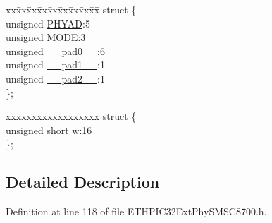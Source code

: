 \begin{DoxyCompactItemize}
\begin{tabbing}
\end{tabbing}\item 
\begin{tabbing}
xx\=xx\=xx\=xx\=xx\=xx\=xx\=xx\=xx\=\kill
struct \{\\
\>unsigned \hyperlink{union_____s_p_e_c_i_a_l_m_o_d_ebits__t_ad7512c2f25e7ba0954f5da603b8d1997}{PHYAD}:5\\
\>unsigned \hyperlink{union_____s_p_e_c_i_a_l_m_o_d_ebits__t_adc56ba18ff3f1599c85d222bee624424}{MODE}:3\\
\>unsigned \hyperlink{union_____s_p_e_c_i_a_l_m_o_d_ebits__t_adf71f3d8410c1f1dbbc96680a92c49af}{\_\_pad0\_\_}:6\\
\>unsigned \hyperlink{union_____s_p_e_c_i_a_l_m_o_d_ebits__t_acaf2d0924a107ec6e8d2e31febaf66f9}{\_\_pad1\_\_}:1\\
\>unsigned \hyperlink{union_____s_p_e_c_i_a_l_m_o_d_ebits__t_a4d97cc5f7d51d22fc2bf3eab35c9cb7f}{\_\_pad2\_\_}:1\\
\}; \\

\end{tabbing}\item 
\begin{tabbing}
xx\=xx\=xx\=xx\=xx\=xx\=xx\=xx\=xx\=\kill
struct \{\\
\>unsigned short \hyperlink{union_____s_p_e_c_i_a_l_m_o_d_ebits__t_a160850a4684a3e82c2323033964f2e98}{w}:16\\
\}; \\

\end{tabbing}\end{DoxyCompactItemize}


\subsection{Detailed Description}


Definition at line 118 of file E\+T\+H\+P\+I\+C32\+Ext\+Phy\+S\+M\+S\+C8700.\+h.



